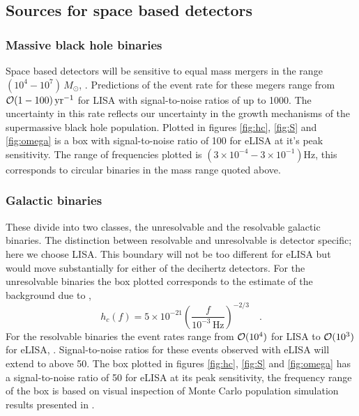 \documentclass[fleqn,12pt]{iopart}
\newcommand{\Msun}{\ensuremath{M_{ \odot }}}
\begin{document}
\subsection{Sources for space based detectors}

\subsubsection{Massive black hole binaries}
Space based detectors will be sensitive to equal mass mergers in the range $(10^{4}-10^{7})\,\Msun$, \cite{JohnsLivingReview}. Predictions of the event rate for these megers range from ${\cal{O}}(1-100)\,\textrm{yr}^{-1}$ for LISA with signal-to-noise ratios of up to 1000. The uncertainty in this rate reflects our uncertainty in the growth mechanisms of the supermassive black hole population. Plotted in figures \ref{fig:hc}, \ref{fig:S} and \ref{fig:omega} is a box with signal-to-noise ratio of 100 for eLISA at it's peak sensitivity. The range of frequencies plotted is $(3\times 10^{-4}-3\times 10^{-1})\textrm{Hz}$, this corresponds to circular binaries in the mass range quoted above.

\subsubsection{Galactic binaries} \label{sec:GB}
These divide into two classes, the unresolvable and the resolvable galactic binaries. The distinction between resolvable and unresolvable is detector specific; here we choose LISA. This boundary will not be too different for eLISA but would move substantially for either of the decihertz detectors. For the unresolvable binaries the box plotted corresponds to the estimate of the background due to \cite{Nelemans},
\begin{equation} h_{c}(f)= 5\times 10^{-21} \left(\frac{f}{10^{-3}\,\textrm{Hz}}\right)^{-2/3} \quad . \end{equation}
For the resolvable binaries the event rates range from ${\cal{O}}(10^{4})$ for LISA to ${\cal{O}}(10^{3})$ for eLISA, \cite{JohnsLivingReview}. Signal-to-noise ratios for these events observed with eLISA will extend to above 50. The box plotted in figures \ref{fig:hc}, \ref{fig:S} and \ref{fig:omega} has a signal-to-noise ratio of 50 for eLISA at its peak sensitivity, the frequency range of the box is based on visual inspection of Monte Carlo population simulation results presented in \cite{DoingScienceWitheLISA}.
\end{document}
